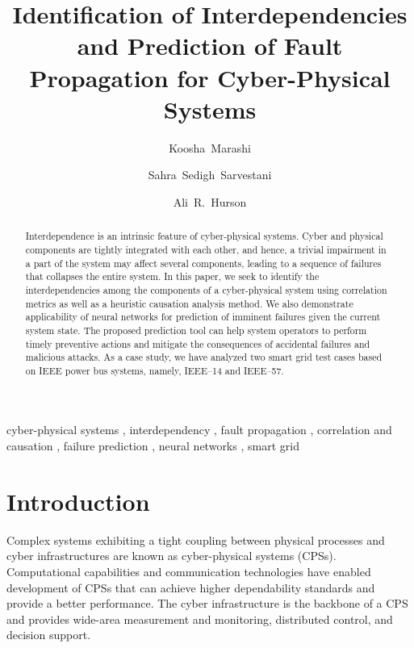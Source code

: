 \documentclass[12pt]{elsarticle}
\begin{document}
\begin{frontmatter}

\title{Identification of Interdependencies and Prediction of Fault Propagation for Cyber-Physical Systems}

\author[romeo]{Koosha~Marashi}
\author[s_and_t]{Sahra~Sedigh~Sarvestani}
\author[s_and_t]{Ali~R.~Hurson}

\address[romeo]{Romeo Power Technology, Vernon, CA 90058, USA}
\address[s_and_t]{Missouri University of Science and Technology, Rolla, MO 65409, USA}

\begin{abstract}
Interdependence is an intrinsic feature of cyber-physical systems. Cyber and physical components are tightly integrated with each other, and hence, a trivial impairment in a part of the system may affect several components, leading to a sequence of failures that collapses the entire system. In this paper, we seek to identify the interdependencies among the components of a cyber-physical system using correlation metrics as well as a heuristic causation analysis method. We also demonstrate applicability of neural networks for prediction of imminent failures given the current system state. The proposed prediction tool can help system operators to perform timely preventive actions and mitigate the consequences of accidental failures and malicious attacks. As a case study, we have analyzed two smart grid test cases based on IEEE power bus systems, namely, IEEE--14 and IEEE--57.
\end{abstract}

\begin{keyword}
cyber-physical systems \sep
interdependency \sep
fault propagation \sep
correlation and causation \sep
failure prediction \sep
neural networks \sep
smart grid
\end{keyword}

\end{frontmatter}

\section{Introduction}\label{sec:intro}
Complex systems exhibiting a tight coupling between physical processes and cyber infrastructures are known as cyber-physical systems (CPSs). Computational capabilities and communication technologies have enabled development of CPSs that can achieve higher dependability standards and provide a better performance. The cyber infrastructure is the backbone of a CPS and provides wide-area measurement and monitoring, distributed control, and decision support.
\end{document}
